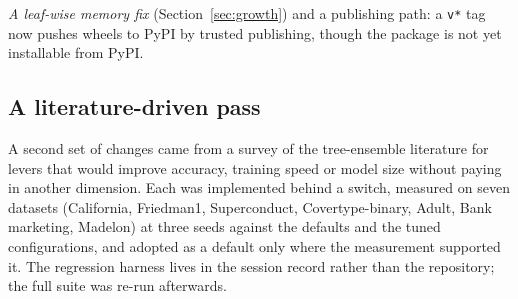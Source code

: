 \documentclass[11pt,a4paper]{article}
\newcommand{\code}[1]{\texttt{\small #1}}
\theoremstyle{definition}
\begin{document}
\emph{A leaf-wise memory fix} (Section~\ref{sec:growth}) and a publishing path:
a \code{v*} tag now pushes wheels to PyPI by trusted publishing, though the
package is not yet installable from PyPI.

\subsection{A literature-driven pass}\label{sec:litpass}

A second set of changes came from a survey of the tree-ensemble literature
for levers that would improve accuracy, training speed or model size without
paying in another dimension. Each was implemented behind a switch, measured on
seven datasets (California, Friedman1, Superconduct, Covertype-binary, Adult,
Bank marketing, Madelon) at three seeds against the defaults and the tuned
configurations, and adopted as a default only where the measurement supported
it. The regression harness lives in the session record rather than the
repository; the full suite was re-run afterwards.
\end{document}
